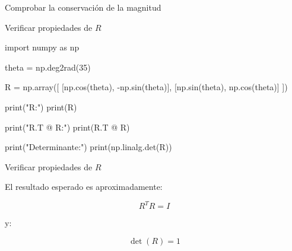 \documentclass[aspectratio=169]{beamer}
\begin{document}
\begin{frame}{Comprobar la conservación de la magnitud}


    \vspace{0.3cm}


\end{frame}

\begin{frame}[fragile]{Verificar propiedades de \texorpdfstring{$R$}{R}}

    \begin{pythoncodedark}
        import numpy as np

        theta = np.deg2rad(35)

        R = np.array([
            [np.cos(theta), -np.sin(theta)],
            [np.sin(theta),  np.cos(theta)]
            ])

        print("R:")
        print(R)

        print("R.T @ R:")
        print(R.T @ R)

        print("Determinante:")
        print(np.linalg.det(R))
    \end{pythoncodedark}

\end{frame}

\begin{frame}{Verificar propiedades de \texorpdfstring{$R$}{R}}

    El resultado esperado es aproximadamente:

    \[
    R^TR=I
    \]

    y:

    \[
    \det(R)=1
    \]

    \vspace{0.3cm}


\end{frame}
\end{document}
